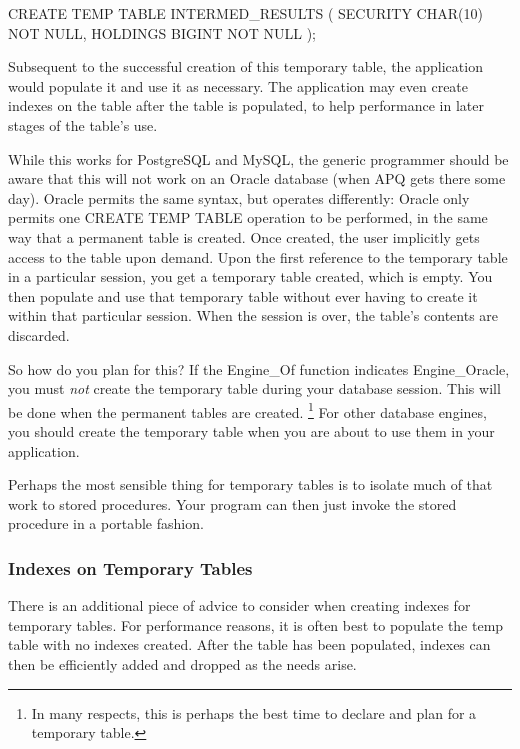 \documentclass[english,letterpaper]{book}
\begin{document}
\begin{SQL}
CREATE TEMP TABLE INTERMED_RESULTS (
   SECURITY  CHAR(10) NOT NULL,
   HOLDINGS  BIGINT NOT NULL
);
\end{SQL}

Subsequent to the successful creation of this temporary table, the
application would populate it and use it as necessary. The application
may even create indexes on the table after the table is populated,
to help performance in later stages of the table's use.

While this works for PostgreSQL and MySQL, the generic programmer
should be aware that this will not work on an Oracle database (when
APQ gets there some day). Oracle permits the same syntax, but operates
differently: Oracle only permits one CREATE TEMP TABLE operation to
be performed, in the same way that a permanent table is created. Once
created, the user implicitly gets access to the table upon demand.
Upon the first reference to the temporary table in a particular session,
you get a temporary table created, which is empty. You then populate
and use that temporary table without ever having to create it within
that particular session. When the session is over, the table's contents
are discarded.

So how do you plan for this? If the Engine\_Of function
indicates Engine\_Oracle, you must \emph{not} create the
temporary table during your database session. This will be done when
the permanent tables are created.%
\footnote{In many respects, this is perhaps the best time to declare and plan
for a temporary table.%
} For other database engines, you should create the temporary table
when you are about to use them in your application.

Perhaps the most sensible thing for temporary tables is to isolate
much of that work to stored procedures. Your program can then just
invoke the stored procedure in a portable fashion.


\subsubsection{Indexes on Temporary Tables}

There is an additional piece of advice to consider when creating indexes
for temporary tables. For performance reasons, it is often best to
populate the temp table with no indexes created. After the table has
been populated, indexes can then be efficiently added and dropped
as the needs arise.
\end{document}
